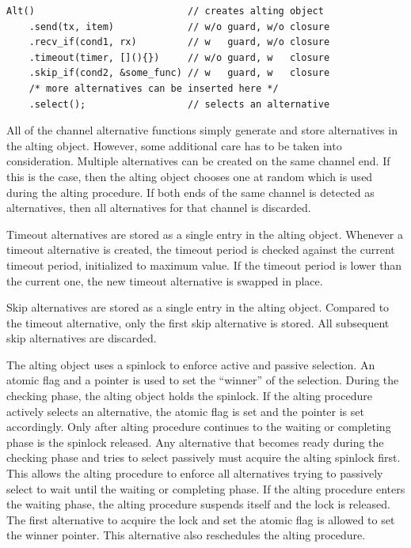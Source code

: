 \begin{lstfloat}
\begin{lstlisting}[caption={Code example of alting.}, label={lst:code_example_alting}, style={CustomC++}]
Alt()                           // creates alting object
    .send(tx, item)             // w/o guard, w/o closure
    .recv_if(cond1, rx)         // w   guard, w/o closure
    .timeout(timer, [](){})     // w/o guard, w   closure
    .skip_if(cond2, &some_func) // w   guard, w   closure
    /* more alternatives can be inserted here */
    .select();                  // selects an alternative
\end{lstlisting}
\end{lstfloat}

All of the channel alternative functions simply generate and store alternatives in the alting object. However, some additional care has to be taken into consideration. Multiple alternatives can be created on the same channel end. If this is the case, then the alting object chooses one at random which is used during the alting procedure. If both ends of the same channel is detected as alternatives, then all alternatives for that channel is discarded.

Timeout alternatives are stored as a single entry in the alting object. Whenever a timeout alternative is created, the timeout period is checked against the current timeout period, initialized to maximum value. If the timeout period is lower than the current one, the new timeout alternative is swapped in place.

Skip alternatives are stored as a single entry in the alting object. Compared to the timeout alternative, only the first skip alternative is stored. All subsequent skip alternatives are discarded.

The alting object uses a spinlock to enforce active and passive selection. An atomic flag and a pointer is used to set the ``winner'' of the selection. During the checking phase, the alting object holds the spinlock. If the alting procedure actively selects an alternative, the atomic flag is set and the pointer is set accordingly. Only after alting procedure continues to the waiting or completing phase is the spinlock released. Any alternative that becomes ready during the checking phase and tries to select passively must acquire the alting spinlock first. This allows the alting procedure to enforce all alternatives trying to passively select to wait until the waiting or completing phase. 
If the alting procedure enters the waiting phase, the alting procedure suspends itself and the lock is released. The first alternative to acquire the lock and set the atomic flag is allowed to set the winner pointer. This alternative also reschedules the alting procedure. 

